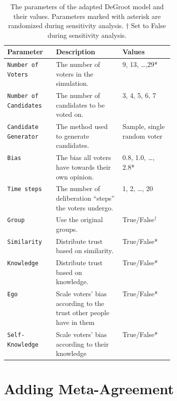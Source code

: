 \renewcommand{\arraystretch}{1.2}
\begin{table}
	\centering
	\begin{tabular}{lp{0.4\linewidth}l}
		\toprule
		Parameter                     & Description                                                         & Values                      \\
		\midrule
		\texttt{Number of Voters}     & The number of voters in the simulation.                             & 9,  13, \dots,29*           \\
		\texttt{Number of Candidates} & The number of candidates to be voted on.                            & 3, 4, 5, 6, 7               \\
		\texttt{Candidate Generator}  & The method used to generate candidates.                             & Sample, single random voter \\
		\texttt{Bias}                 & The bias all voters have towards their own opinion.                 & 0.8, 1.0, \dots, 2.8*       \\
		\texttt{Time steps}           & The number of deliberation ``steps'' the voters undergo.            & 1, 2, \dots, 20             \\
		\texttt{Group}                & Use the original groups.                                            & True/False$^\dagger$        \\
		\texttt{Similarity}           & Distribute trust based on similarity.                               & True/False*                 \\
		\texttt{Knowledge}            & Distribute trust based on knowledge.                                & True/False*                 \\
		\texttt{Ego}                  & Scale voters' bias according to the trust other people have in them & True/False*                 \\
		\texttt{Self-Knowledge}       & Scale voters' bias according to their knowledge                     & True/False*                 \\
		\bottomrule
	\end{tabular}
	\label{tab:independent_variables}
	\caption{The parameters of the adapted DeGroot model and their values. Parameters marked with asterisk are randomized during sensitivity analysis. $\dagger$ Set to False during sensitivity analysis.}
\end{table}


\section{Adding Meta-Agreement}

